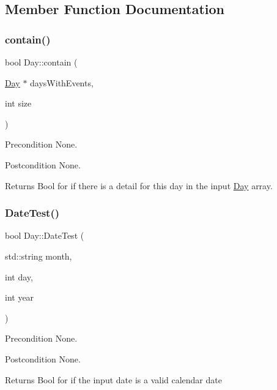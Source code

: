 \subsection{Member Function Documentation}
\hypertarget{class_day_a84a4efadd13d49d372d47ad609c5f598}{}\label{class_day_a84a4efadd13d49d372d47ad609c5f598} 
\subsubsection{\texorpdfstring{contain()}{contain()}}
{\footnotesize\ttfamily bool Day\+::contain (\begin{DoxyParamCaption}\item[{\hyperlink{class_day}{Day} $\ast$}]{days\+With\+Events,  }\item[{int}]{size }\end{DoxyParamCaption})}

\begin{DoxyPrecond}{Precondition}
None. 
\end{DoxyPrecond}
\begin{DoxyPostcond}{Postcondition}
None. 
\end{DoxyPostcond}
\begin{DoxyReturn}{Returns}
Bool for if there is a detail for this day in the input \hyperlink{class_day}{Day} array. 
\end{DoxyReturn}
\hypertarget{class_day_afb77f4b9df921cfb4176ba6ef309b9b8}{}\label{class_day_afb77f4b9df921cfb4176ba6ef309b9b8} 
\subsubsection{\texorpdfstring{Date\+Test()}{DateTest()}}
{\footnotesize\ttfamily bool Day\+::\+Date\+Test (\begin{DoxyParamCaption}\item[{std\+::string}]{month,  }\item[{int}]{day,  }\item[{int}]{year }\end{DoxyParamCaption})}

\begin{DoxyPrecond}{Precondition}
None. 
\end{DoxyPrecond}
\begin{DoxyPostcond}{Postcondition}
None. 
\end{DoxyPostcond}
\begin{DoxyReturn}{Returns}
Bool for if the input date is a valid calendar date 
\end{DoxyReturn}
\hypertarget{class_day_a6161ef9f7717d596af00031cc362fa04}{}\label{class_day_a6161ef9f7717d596af00031cc362fa04} 
